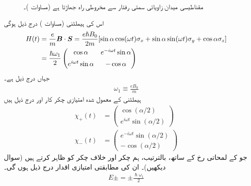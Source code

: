 \begin{figure}
\centering
{}
\caption{مقناطیسی میدان زاویائی سمتی رفتار  سے مخروطی راہ جھاڑتا ہے (مساوات )۔ }
\label{شکل_حرارت_نا_گزر_مخروطی_راہ_جھاڑنا}
\end{figure}


اس کی ہیملٹنی (مساوات ) درج ذیل ہوگی
\begin{gather}
\begin{aligned}\label{مساوات_حر_مخصوص_ہیملٹنی}
H(t) &= \frac{e}{m} {{\boldsymbol{B}}} \cdot {\ensuremath{{\boldsymbol{S}}}} = \frac{e \hslash B_0}{2m} [\sin \alpha \cos(\omega t) \sigma_x + \sin \alpha \sin(\omega t) \sigma_y + \cos \alpha \sigma_z] \\
&= \frac{\hslash \omega_1}{2}
\begin{pmatrix}
\cos \alpha& e^{-i\omega t}\sin \alpha\\[0.5em]
e^{i\omega t}\sin\alpha& -\cos\alpha
\end{pmatrix} 
\end{aligned}
\end{gather}
جہاں  درج ذیل ہے۔
\begin{align}
\omega_1 \equiv \frac{e B_0}{m}
\end{align}
ہیملٹنی  کے معمول شدہ امتیازی چکر کار  اور  درج ذیل ہیں
\begin{align}
\chi_+ (t) &= 
\begin{pmatrix}
\cos(\alpha/2) \\[0.5em]
e^{i \omega t} \sin(\alpha/2)
\end{pmatrix}\\
\chi_{-} (t) &= 
\begin{pmatrix}
e^{-i \omega t} \sin(\alpha/2) \\[0.5em]
- \cos(\alpha/2)
\end{pmatrix}
\end{align}
جو  کے لمحاتی رخ کے ساتھ، بالترتیب، ہم چکر اور خلاف چکر کو ظاہر کرتے ہیں (سوال  دیکھیں)۔ ان کی مطابقتی امتیازی اقدار درج ذیل ہوں گی۔
\begin{align}\label{مساوات_حر_حرکی_ہیّت_توانائی}
E \pm = \pm \frac{\hslash \omega_1}{2}
\end{align}

